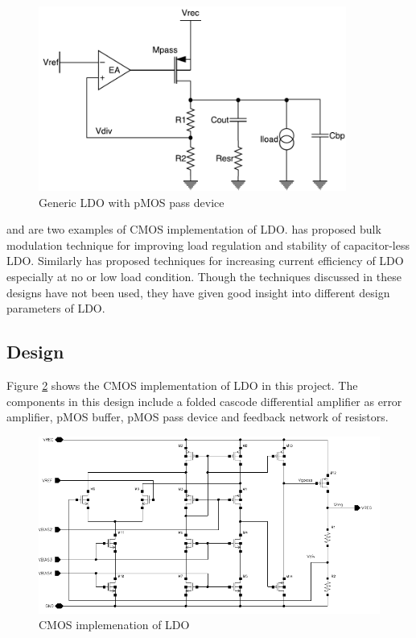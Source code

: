 \documentclass[12pt,a4paper,UKenglish]{article}
\begin{document}
\begin{figure}[htbp] %
   \centering
   \includegraphics[width=0.9\textwidth]{img/ldo.pdf} 
   \caption{Generic LDO with pMOS pass device}
   \label{ldo_gen}
\end{figure}

\cite{ldo_bulkmod} and \cite{ldo_quiescent} are two examples of CMOS implementation of LDO. \cite{ldo_bulkmod} 
has proposed bulk modulation technique for improving load regulation and stability of capacitor-less LDO. 
Similarly \cite{ldo_quiescent} has  proposed techniques for increasing current efficiency of LDO especially at 
no or low load condition. Though the techniques discussed in these designs have not been used, they have given 
good insight into different design parameters of LDO.  \\

\subsection{Design}

Figure \ref{ldo_cmos} shows the CMOS implementation of LDO in this project. The components in this design 
include a folded cascode differential amplifier as error amplifier, pMOS buffer, pMOS pass device and feedback 
network of resistors. \\

\begin{figure}[htbp] %
   \centering
   \includegraphics[width=\textwidth]{img/ldo_schematic.pdf} 
   \caption{CMOS implemenation of LDO}
   \label{ldo_cmos}
\end{figure}
\end{document}

